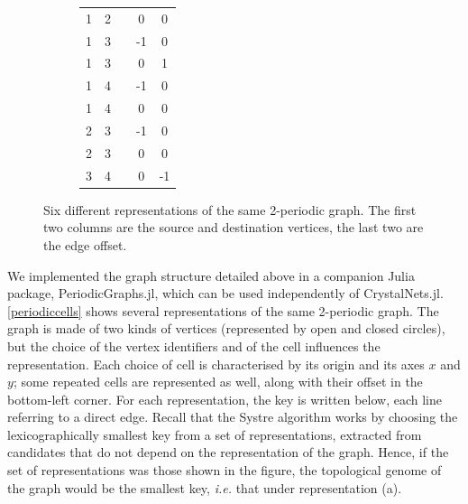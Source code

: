 \documentclass[main.tex]{subfiles}
\begin{document}
\begin{figure}[t]
\begin{subfigure}[b]{0.35\linewidth}
		\centering\scriptsize\begin{tabular}{ccccc}
			1&2&&0&0\\
			1&3&&-1&0\\
			1&3&&0&1\\
			1&4&&-1&0\\
			1&4&&0&0\\
			2&3&&-1&0\\
			2&3&&0&0\\
			3&4&&0&-1
		\end{tabular}
		\vspace{-0.5em}
	\end{subfigure}
	\vspace{2mm}
	\caption{Six different representations of the same 2-periodic graph. The first two columns are the source and destination vertices, the last two are the edge offset.} \label{periodiccells}
\end{figure}

We implemented the graph structure detailed above in a companion Julia package, PeriodicGraphs.jl, which can be used independently of CrystalNets.jl.\\

\autoref{periodiccells} shows several representations of the same 2-periodic graph. The graph is made of two kinds of vertices (represented by open and closed circles), but the choice of the vertex identifiers and of the cell influences the representation. Each choice of cell is characterised by its origin and its axes $x$ and $y$; some repeated cells are represented as well, along with their offset in the bottom-left corner. For each representation, the key is written below, each line referring to a direct edge. Recall that the Systre algorithm works by choosing the lexicographically smallest key from a set of representations, extracted from candidates that do not depend on the representation of the graph. Hence, if the set of representations was those shown in the figure, the topological genome of the graph would be the smallest key, \textit{i.e.} that under representation {\sffamily(a)}.

\end{document}

